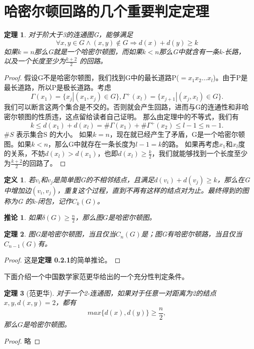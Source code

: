 \documentclass[a4paper,11pt]{book}
\newtheorem{theorem}{\textbf{定理}}[section]
\newtheorem{defination}{\textbf{定义}}[section]
\newtheorem{coro}{\textbf{推论}}[section]
\begin{document}
\section{哈密尔顿回路的几个重要判定定理}
\begin{theorem} {\K 对于阶大于3的连通图G，能够满足$$\forall x, y \in G \wedge (x,y) \notin G \Rightarrow d(x)+d(y)\geq k$$
如果$k=n$那么G就是一个哈密尔顿图，而如果$k<n$那么G中就含有一条k-长路，以及一个长度至少为$\frac{k+2}{2}$ 的回路。}\end{theorem}
\begin{proof} 假设G不是哈密尔顿图，我们找到G中的最长道路P($=x_1x_2\dots x_l$)。由于P是最长道路，所以P是极长道路。考虑$$\Gamma(x_1)=\{x_j|(x_1, x_j) \in G\}, \Gamma^{+}(x_l)=\{x_{j+1}|(x_j, x_l) \in G\}.$$
我们可以断言这两个集合是不交的。否则就会产生回路，进而与G的连通性和非哈密尔顿图的性质违，这点留给读者自己证明。
那么由定理中的不等式，我们有$$k \leq d(x_1)+d(x_l)=\#\Gamma(x_1)+\#\Gamma^{+}(x_2)\leq l-1 \leq n-1.$$$\#S$ 表示集合S 的大小。
如果$k=n$，现在就已经产生了矛盾，G是一个哈密尔顿图。如果$k<n$，那么G中就存在一条长度为$l-1=k$的路。
如果再考虑$x_1$和$x_l$度的关系，不妨$d(x_l)>d(x_1)$，也即$d(x_l)\geq\frac{k}{2}$，我们就能够找到一个长度至少为$\frac{k+2}{2}$的回路了。\end{proof}

\begin{defination} \K 若$v_i$和$v_j$是简单图G的不相邻结点，且满足$d(v_i)+d(v_j)\geq k$，那么在G中增加边$(v_i, v_j)$，重复这个过程，直到不再有这样的结点对为止。最终得到的图称为G 的k-闭包，记作$C_k(G)$。\end{defination}

\begin{coro} \K 如果$\delta(G)\geq \frac{n}{2}$，那么图$G$是哈密尔顿图。\end{coro}

\begin{theorem} \K 图G是哈密尔顿图，当且仅当$C_n(G)$是；图G有哈密尔顿路，当且仅当$C_{n-1}(G)$有。\end{theorem}
\begin{proof} 这是\textbf{定理 0.2.1}的简单推论。\end{proof}

下面介绍一个中国数学家范更华给出的一个充分性判定条件。

\begin{theorem}[范更华]\K 对于一个2-连通图，如果对于任意一对距离为2的结点$x, y, d(x,y)=2$，都有$$max\{d(x),d(y)\}\geq \frac{n}{2},$$那么$G$是哈密尔顿图。\end{theorem}
\begin{proof}略\end{proof}
\end{document}
